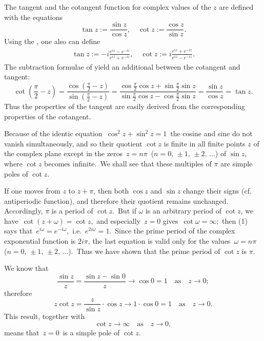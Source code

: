 \documentclass[12pt]{article}
\theoremstyle{definition}
\begin{document}
The tangent and the cotangent function for complex values of the  $z$ are defined with the equations
$$\tan{z} := \frac{\sin{z}}{\cos{z}},\quad \cot{z} := \frac{\cos{z}}{\sin{z}}.$$
Using the , one also can define
\begin{align}
\tan{z} := -i\frac{e^{iz}-e^{-iz}}{e^{iz}+e^{-iz}},\quad 
\cot{z} := i\frac{e^{iz}+e^{-iz}}{e^{iz}-e^{-iz}}.
\end{align}
The subtraction formulae of  yield an additional  between the cotangent and tangent:
$$\cot{(\frac{\pi}{2}-z)} =
\frac{\cos{(\frac{\pi}{2}-z)}}{\sin{(\frac{\pi}{2}-z)}} =
\frac{\cos{\frac{\pi}{2}}\cos{z}+\sin{\frac{\pi}{2}}\sin{z}}
     {\sin{\frac{\pi}{2}}\cos{z}-\cos{\frac{\pi}{2}}\sin{z}} = 
\frac{\sin{z}}{\cos{z}} = \tan{z}.$$
Thus the properties of the tangent are easily derived from the corresponding properties of the cotangent.

Because of the identic equation\, $\cos^2{z}+\sin^2{z} = 1$\, the cosine and sine do not vanish simultaneously, and so their quotient $\cot{z}$ is finite in all finite points $z$ of the complex plane except in the zeros\, $z = n\pi$\, ($n = 0,\,\pm1,\,\pm2,\,\ldots$) of $\sin{z}$, where $\cot{z}$ becomes infinite.\, We shall see that these multiples of $\pi$ are simple poles of $\cot{z}$.

If one moves from $z$ to $z\!+\!\pi$, then both $\cos{z}$ and $\sin{z}$ change their signs (cf. antiperiodic function), and therefore their quotient remains unchanged.\, Accordingly, $\pi$ is a period of $\cot{z}$.\, But if $\omega$ is an arbitrary period of $\cot{z}$, we have\, $\cot{(z\!+\!\omega)} = \cot{z}$,\, and especially\, $z = 0$ gives\, $\cot{\omega} = \infty$;\, then (1) says that\, 
$e^{i\omega} = e^{-i\omega}$,\, i.e.\, $e^{2i\omega} = 1$.\, Since the prime period of the complex exponential function is $2i\pi$, the last equation is valid only for the values\, $\omega = n\pi$\, ($n = 0,\,\pm1,\,\pm2,\,\ldots$).\, Thus we have shown that the prime period of $\cot{z}$ is $\pi$.

We know that
$$\frac{\sin{z}}{z} = \frac{\sin{z}-\sin{0}}{z} \to \cos{0} = 1
\quad \mathrm{as} \quad z\to 0;$$
therefore
$$z\cot{z} = \frac{z}{\sin{z}}\cdot\cos{z} \to 1\cdot\cos{0} = 1
\quad \mathrm{as} \quad z\to 0.$$
This result, together with
$$\cot{z} \to \infty \quad \mathrm{as} \quad z\to 0,$$
means that\, $z = 0$\, is a simple pole of $\cot{z}$.\, 
\end{document}
